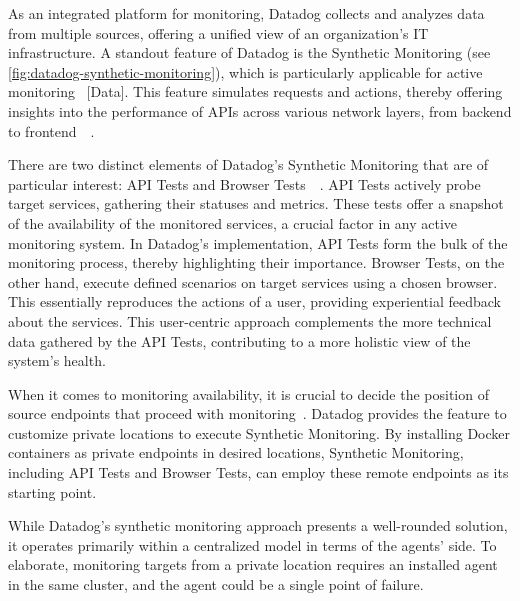 As an integrated platform for monitoring, Datadog collects and analyzes data from multiple sources, offering a unified view of an organization's IT infrastructure. A standout feature of Datadog is the Synthetic Monitoring (see \autoref{fig:datadog-synthetic-monitoring}), which is particularly applicable for active monitoring~\parencite{datadogSyntheticMonitoring} [Data]. This feature simulates requests and actions, thereby offering insights into the performance of APIs across various network layers, from backend to frontend~\parencite{datadogAPITests}~\parencite{datadogBrowserTests}. 

There are two distinct elements of Datadog's Synthetic Monitoring that are of particular interest: API Tests and Browser Tests~\parencite{datadogAPITests}~\parencite{datadogBrowserTests}. API Tests actively probe target services, gathering their statuses and metrics. These tests offer a snapshot of the availability of the monitored services, a crucial factor in any active monitoring system. In Datadog's implementation, API Tests form the bulk of the monitoring process, thereby highlighting their importance. Browser Tests, on the other hand, execute defined scenarios on target services using a chosen browser. This essentially reproduces the actions of a user, providing experiential feedback about the services. This user-centric approach complements the more technical data gathered by the API Tests, contributing to a more holistic view of the system's health. 

When it comes to monitoring availability, it is crucial to decide the position of source endpoints that proceed with monitoring~\parencite{datadogRunSyntheticTests}. Datadog provides the feature to customize private locations to execute Synthetic Monitoring. By installing Docker containers as private endpoints in desired locations, Synthetic Monitoring, including API Tests and Browser Tests, can employ these remote endpoints as its starting point. 

While Datadog's synthetic monitoring approach presents a well-rounded solution, it operates primarily within a centralized model in terms of the agents' side. To elaborate, monitoring targets from a private location requires an installed agent in the same cluster, and the agent could be a single point of failure. 